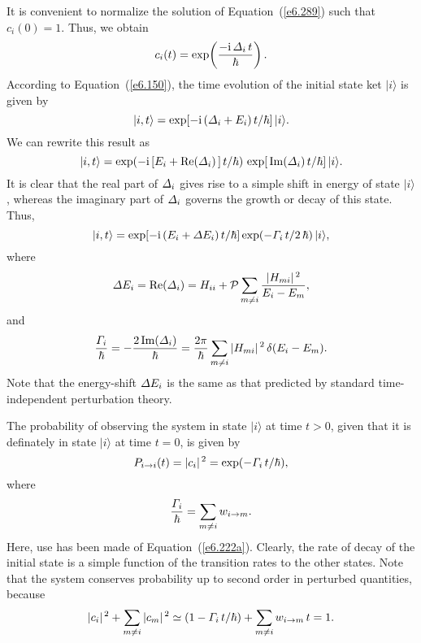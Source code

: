  It is convenient to normalize the solution of
Equation~(\ref{e6.289}) such that $c_i(0) = 1$. Thus, we obtain
\begin{equation}
c_i(t) = \exp\!\left(\frac{-{\rm i}\, {\mit\Delta}_i\, t}{\hbar}\right).
\end{equation}
According to Equation~(\ref{e6.150}),  the time evolution of the initial
state ket $|i\rangle$ is given by
\begin{equation}
|i, t\rangle = \exp[-{\rm i}\,({\mit\Delta}_i + E_i)\,t/\hbar] \,|i\rangle.
\end{equation}
We can rewrite this result as
\begin{equation}\label{e6.295}
|i, t\rangle = \exp(-{\rm i}\,[E_i + {\rm Re}({\mit\Delta}_i)\,]\,t/\hbar)\,
\exp[\,{\rm Im}({\mit\Delta}_i)\,t/\hbar] \,|i\rangle.
\end{equation}
It is clear that the real part of ${\mit\Delta}_i$ gives rise to a simple
shift in energy of state $|i\rangle$, whereas the imaginary part of
${\mit\Delta}_i$ governs the growth or decay  of this state. 
Thus,
\begin{equation}
|i, t\rangle = \exp[-{\rm i}\,(E_i + {\mit\Delta} E_i)\,t/\hbar]
\exp( - {\mit\Gamma}_i\,t/2\,\hbar)\,|i\rangle,
\end{equation}
where
\begin{equation}
{\mit\Delta} E_i = {\rm  Re}({\mit\Delta}_i) =  H_{ii} + {\cal P} \sum_{m\neq i}
\frac{|H_{mi}|^{\,2}}{E_i - E_m} ,
\end{equation}
and
\begin{equation}
\frac{{\mit\Gamma}_i}{\hbar} = - \frac{2\,{\rm Im}({\mit\Delta}_i)}{\hbar}
= \frac{2\pi}{\hbar} \sum_{m\neq i} |H_{mi}|^{\,2}\,\delta(E_i - E_m).
\end{equation}
Note that the energy-shift ${\mit\Delta} E_i$ is the same as that predicted
by standard time-independent perturbation theory. 

The probability of observing the system in state $|i\rangle$ at time $t>0$, given
that it is definately in state $|i\rangle$ at time $t=0$, is given by
\begin{equation}
P_{i\rightarrow i} (t) = |c_i|^{\,2} = \exp(-{\mit\Gamma}_i\,t/ \hbar),
\end{equation}
where 
\begin{equation}
\frac{{\mit\Gamma}_i}{\hbar} = \sum_{m\neq i} w_{i\rightarrow m}.
\end{equation}
Here, use has been made of Equation~(\ref{e6.222a}).
Clearly, the rate of decay of the initial state is  a simple function of 
the transition rates to the other states.  Note that the system conserves
 probability up to second order in perturbed quantities, because
\begin{equation}
|c_i|^{\,2} + \sum_{m\neq i} |c_m|^{\,2} \simeq (1- {\mit\Gamma}_i\,t/ \hbar)
+ \sum_{m\neq i} w_{i\rightarrow m} \,t = 1.
\end{equation}

